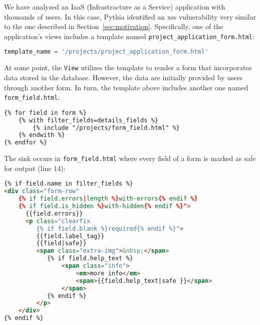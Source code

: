We have analyzed an IaaS
(Infrastracture as a Service)
application with thousands of users.
In this case,
Pythia identified an {\sc xss} vulnerability
very similar to the one described in
Section~\ref{sec:motivation}.
Specifically,
one of the application's views
includes a template named
{\tt project\_application\_form.html}:

\vspace{0.8mm}
\begin{lstlisting}[language=Python, basicstyle=\footnotesize\ttfamily]
 template_name = '/projects/project_application_form.html'
\end{lstlisting}
\vspace{0.8mm}

\noindent
At some point,
the {\tt View} utilizes the template to render a form
that incorporates data stored in the database.
However,
the data are initially provided by users
through another form.
In turn,
the template above
includes another one named
{\tt form\_field.html}:

\vspace{0.8mm}
\begin{lstlisting}[language=html,basicstyle=\footnotesize\ttfamily]
{% for field in form %}
    {% with filter_fields=details_fields %}
        {% include "/projects/form_field.html" %}
    {% endwith %}
{% endfor %}
\end{lstlisting}
\vspace{0.8mm}

\noindent
The sink occurs in {\tt form\_field.html}
where every field of a form is marked as safe
for output (line 14):

\vspace{0.8mm}
\begin{lstlisting}[language=html,basicstyle=\footnotesize\ttfamily]
{% if field.name in filter_fields %}
<div class="form-row"
    {% if field.errors|length %}with-errors{% endif %}
    {% if field.is_hidden %}with-hidden{% endif %}">
      {{field.errors}}
      <p class="clearfix
         {% if field.blank %}required{% endif %}">
         {{field.label_tag}}
         {{field|safe}}
         <span class="extra-img">&nbsp;</span>
            {% if field.help_text %}
                <span class="info">
                    <em>more info</em>
                    <span>{{field.help_text|safe }}</span>
                </span>
            {% endif %}
         </p>
    </div>
{% endif %}
\end{lstlisting}
\vspace{0.8mm}

